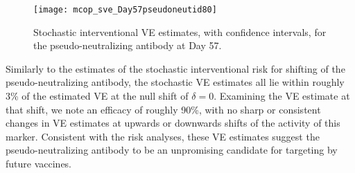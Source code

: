 \begin{figure}[H]
  \centering
  \texttt{[image: mcop\_sve\_Day57pseudoneutid80]}
  \caption{Stochastic interventional VE estimates, with confidence intervals,
  for the pseudo-neutralizing antibody at Day 57.}
  \label{fig:marker4-sve-day57}
\end{figure}

Similarly to the estimates of the stochastic interventional risk for shifting of
the pseudo-neutralizing antibody, the stochastic VE estimates all lie within
roughly 3\% of the estimated VE at the null shift of $\delta = 0$. Examining the
VE estimate at that shift, we note an efficacy of roughly 90\%, with no sharp or
consistent changes in VE estimates at upwards or downwards shifts of the
activity of this marker. Consistent with the risk analyses, these VE estimates
suggest the pseudo-neutralizing antibody to be an unpromising candidate for
targeting by future vaccines.
